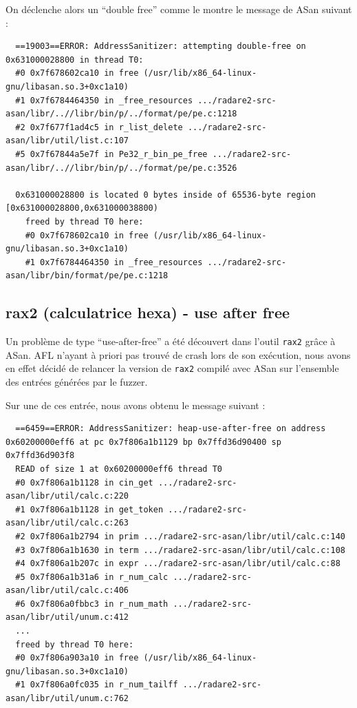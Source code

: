 On déclenche alors un ``double free'' comme le montre le message de ASan suivant :

\begin{lstlisting}
  ==19003==ERROR: AddressSanitizer: attempting double-free on 0x631000028800 in thread T0:
  #0 0x7f678602ca10 in free (/usr/lib/x86_64-linux-gnu/libasan.so.3+0xc1a10)
  #1 0x7f6784464350 in _free_resources .../radare2-src-asan/libr/..//libr/bin/p/../format/pe/pe.c:1218
  #2 0x7f677f1ad4c5 in r_list_delete .../radare2-src-asan/libr/util/list.c:107
  #5 0x7f67844a5e7f in Pe32_r_bin_pe_free .../radare2-src-asan/libr/..//libr/bin/p/../format/pe/pe.c:3526

  0x631000028800 is located 0 bytes inside of 65536-byte region [0x631000028800,0x631000038800)
    freed by thread T0 here:
    #0 0x7f678602ca10 in free (/usr/lib/x86_64-linux-gnu/libasan.so.3+0xc1a10)
    #1 0x7f6784464350 in _free_resources .../radare2-src-asan/libr/bin/format/pe/pe.c:1218
\end{lstlisting}


\subsection{rax2 (calculatrice hexa) - use after free}

Un problème de type ``use-after-free'' a été découvert dans l'outil \lstinline{rax2} grâce à ASan.
AFL n'ayant à priori pas trouvé de crash lors de son exécution, nous avons en effet décidé de relancer la version de \lstinline{rax2} compilé avec ASan sur l'ensemble des entrées générées par le fuzzer.

Sur une de ces entrée, nous avons obtenu le message suivant :

\begin{lstlisting}
  ==6459==ERROR: AddressSanitizer: heap-use-after-free on address 0x60200000eff6 at pc 0x7f806a1b1129 bp 0x7ffd36d90400 sp 0x7ffd36d903f8
  READ of size 1 at 0x60200000eff6 thread T0
  #0 0x7f806a1b1128 in cin_get .../radare2-src-asan/libr/util/calc.c:220
  #1 0x7f806a1b1128 in get_token .../radare2-src-asan/libr/util/calc.c:263
  #2 0x7f806a1b2794 in prim .../radare2-src-asan/libr/util/calc.c:140
  #3 0x7f806a1b1630 in term .../radare2-src-asan/libr/util/calc.c:108
  #4 0x7f806a1b207c in expr .../radare2-src-asan/libr/util/calc.c:88
  #5 0x7f806a1b31a6 in r_num_calc .../radare2-src-asan/libr/util/calc.c:406
  #6 0x7f806a0fbbc3 in r_num_math .../radare2-src-asan/libr/util/unum.c:412
  ...
  freed by thread T0 here:
  #0 0x7f806a903a10 in free (/usr/lib/x86_64-linux-gnu/libasan.so.3+0xc1a10)
  #1 0x7f806a0fc035 in r_num_tailff .../radare2-src-asan/libr/util/unum.c:762
\end{lstlisting}

